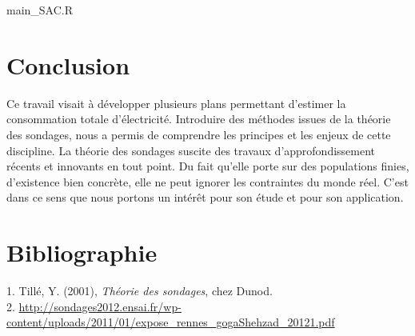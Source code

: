 \documentclass[11pt,fleqn]{book} %
\begin{document}
 {main_SAC.R}



\chapter{Conclusion}

Ce travail visait à développer plusieurs plans permettant d’estimer la consommation totale d'électricité. Introduire des méthodes issues de la théorie des sondages, nous a permis de comprendre les principes et les enjeux de cette discipline. La théorie des sondages suscite des travaux d’approfondissement récents et innovants en tout point. Du fait qu’elle porte sur des populations finies, d’existence bien concrète, elle ne peut ignorer les contraintes du monde réel. C'est dans ce sens que nous portons un intérêt pour son étude et pour son application.  




\chapter*{Bibliographie}

  1. Tillé, Y. (2001), \textit{Théorie des sondages}, chez Dunod.\\
  2. \url{http://sondages2012.ensai.fr/wp-content/uploads/2011/01/expose_rennes_gogaShehzad_20121.pdf}




\end{document}
